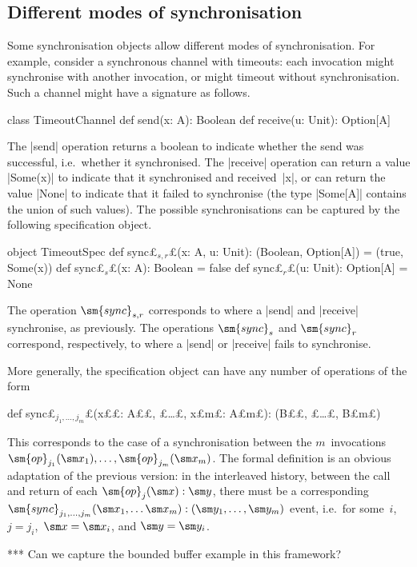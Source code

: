 

\subsection{Different modes of synchronisation}

Some synchronisation objects allow different modes of synchronisation.  For
example, consider a synchronous channel with timeouts: each invocation might
synchronise with another invocation, or might timeout without
synchronisation.  Such a channel might have a signature as follows.
%
\begin{scala}
class TimeoutChannel{
  def send(x: A): Boolean
  def receive(u: Unit): Option[A]
}
\end{scala}
%
The |send| operation returns a boolean to indicate whether the send was
successful, i.e.~whether it synchronised.  The |receive| operation can return
a value |Some(x)| to indicate that it synchronised and received~|x|, or can
return the value |None| to indicate that it failed to synchronise (the type
|Some[A]| contains the union of such values).  The possible synchronisations
can be captured by the following specification object.
\begin{scala}
object TimeoutSpec{
  def sync£$_{s,r}$£(x: A, u: Unit): (Boolean, Option[A]) = (true, Some(x))
  def sync£$_s$£(x: A): Boolean = false
  def sync£$_r$£(u: Unit): Option[A] = None
}
\end{scala}
%
The operation $\sm{sync}_{s,r}$ corresponds to where a |send| and |receive|
synchronise, as previously.  The operations $\sm{sync}_s$ and $\sm{sync}_r$
correspond, respectively, to where a |send| or |receive| fails to
synchronise.  

More generally, the specification object can have any number of operations of
the form
%
\begin{scala}
  def sync£$_{j_1, \ldots, j_m}$£(x££: A££, £\ldots£, x£\s m£: A£\s m£): (B££, £\ldots£, B£\s m£)
\end{scala}
%
This corresponds to the case of a synchronisation between the $m$~invocations
$\sm{op}_{j_1}(\sm x_1), \ldots, \sm{op}_{j_m}(\sm x_m)$.  The formal
definition is an obvious adaptation of the previous version: in the
interleaved history, between the call and return of each $\sm{op}_j(\sm x):
\sm y$, there must be a corresponding $\sm{sync}_{j_1, \ldots, j_m}(\sm x_1,
\ldots \sm x_m): (\sm y_1, \ldots, \sm y_m)$ event, i.e.~for some~$i$,\, $j =
j_i$,\, $\sm x = \sm x_i$, and $\sm y = \sm y_i$.

*** Can we capture the bounded buffer example in this framework? 
